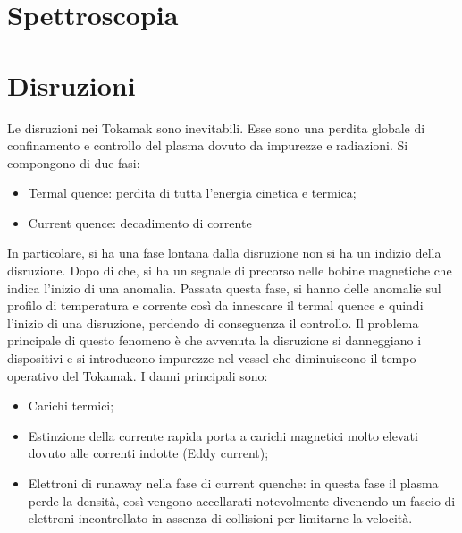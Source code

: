 \documentclass{article}
\begin{document}
\section{Spettroscopia}
\section{Disruzioni}
Le disruzioni nei Tokamak sono inevitabili. Esse sono una perdita globale di confinamento e controllo del plasma dovuto da impurezze e radiazioni.\newline
Si compongono di due fasi:
\begin{itemize}
    \item Termal quence: perdita di tutta l'energia cinetica e termica;
    \item Current quence: decadimento di corrente
\end{itemize}
In particolare, si ha una fase lontana dalla disruzione non si ha un indizio della disruzione. Dopo di che, si ha un segnale di precorso nelle bobine magnetiche che indica l'inizio di una anomalia. Passata questa fase, si hanno delle anomalie sul profilo di temperatura e corrente così da innescare il termal quence e quindi l'inizio di una disruzione, perdendo di conseguenza il controllo.\newline
Il problema principale di questo fenomeno è che avvenuta la disruzione si danneggiano i dispositivi e si introducono impurezze nel vessel che diminuiscono il tempo operativo del Tokamak. I danni principali sono:
\begin{itemize}
    \item Carichi termici;
    \item Estinzione della corrente rapida porta a carichi magnetici molto elevati dovuto alle correnti indotte (Eddy current);
    \item Elettroni di runaway nella fase di current quenche: in questa fase il plasma perde la densità, così vengono accellarati notevolmente divenendo un fascio di elettroni incontrollato in assenza di collisioni per limitarne la velocità.
\end{itemize}
\end{document}
